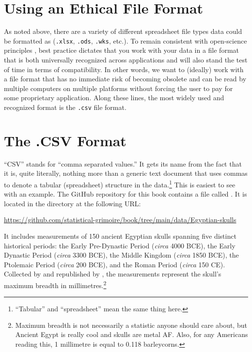 \section{Using an Ethical File Format}
\label{sec:ethical_file}

As noted above, there are a variety of different spreadsheet file types data could be formatted as (\texttt{.xlsx}, \texttt{.ods}, \texttt{.wks}, etc.). To remain consistent with open-science principles \parencite{UNESCO_open_sci}, best practice dictates that you work with your data in a file format that is both universally recognized across applications and will also stand the test of time in terms of compatibility.  In other words, we want to (ideally) work with a file format that has no immediate risk of becoming obsolete and can be read by multiple computers on multiple platforms without forcing the user to pay for some proprietary application. Along these lines, the most widely used and recognized format is the \texttt{.csv} file format.

\section{The .CSV Format}

``CSV'' stands for ``comma separated values.'' It gets its name from the fact that it is, quite literally, nothing more than a generic text document that uses commas to denote a tabular (spreadsheet) structure in the data.\footnote{``Tabular'' and ``spreadsheet'' mean the same thing here.} This is easiest to see with an example. The GitHub repository for this book contains a file called . It is located in the  directory at the following URL:

\begin{center}
\url{https://github.com/statistical-grimoire/book/tree/main/data/Egyptian-skulls}
\end{center}

\noindent
It includes measurements of 150 ancient Egyptian skulls spanning five distinct historical periods: the Early Pre-Dynastic Period (\textit{circa} 4000 BCE), the Early Dynastic Period (\textit{circa} 3300 BCE), the Middle Kingdom (\textit{circa} 1850 BCE), the Ptolemaic Period (\textit{circa} 200 BCE), and the Roman Period (\textit{circa} 150 CE). Collected by \textcite{Thomson1905} and republished by \textcite{Manly1984}, the measurements represent the skull's maximum breadth in millimetres.\footnote{Maximum breadth is not necessarily a statistic anyone should care about, but Ancient Egypt is really cool and skulls are metal AF. Also, for any Americans reading this, 1 millimetre is equal to 0.118 barleycorns.}

